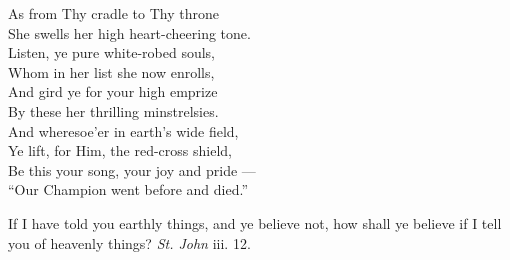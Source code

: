  As from Thy cradle to Thy throne \\
 She swells her high heart-cheering tone. \\
  Listen, ye pure white-robed souls, \\
 Whom in her list she now enrolls, \\
 And gird ye for your high emprize \\
 By these her thrilling minstrelsies. \\
  And wheresoe’er in earth’s wide field, \\
 Ye lift, for Him, the red-cross shield, \\
 Be this your song, your joy and pride — \\
 “Our Champion went before and died.”\\


If I have told you earthly things, and ye believe not, how shall ye believe if I tell you of heavenly things? \emph{St. John} iii. 12.

